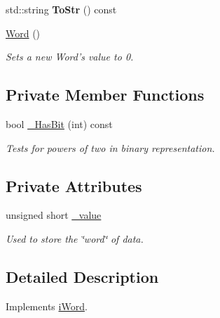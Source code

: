 \begin{DoxyCompactItemize}
\item 
\hypertarget{classWord_a5f8c5dcdb847ed96021ef9282ccc7e76}{
std::string {\bfseries ToStr} () const }
\label{classWord_a5f8c5dcdb847ed96021ef9282ccc7e76}

\item 
\hypertarget{classWord_a17baf7109d46beb48d5b469f3baedc48}{
\hyperlink{classWord_a17baf7109d46beb48d5b469f3baedc48}{Word} ()}
\label{classWord_a17baf7109d46beb48d5b469f3baedc48}

\begin{DoxyCompactList}\small\item\em Sets a new Word's value to 0. \item\end{DoxyCompactList}\end{DoxyCompactItemize}
\subsection*{Private Member Functions}
\begin{DoxyCompactItemize}
\item 
bool \hyperlink{classWord_a7190b6fab0a952eac77da5c0f4ddd0cf}{\_\-HasBit} (int) const 
\begin{DoxyCompactList}\small\item\em Tests for powers of two in binary representation. \item\end{DoxyCompactList}\end{DoxyCompactItemize}
\subsection*{Private Attributes}
\begin{DoxyCompactItemize}
\item 
unsigned short \hyperlink{classWord_a8b0aa1f2042266f307c51b3bdafa9128}{\_\-value}
\begin{DoxyCompactList}\small\item\em Used to store the \char`\"{}word\char`\"{} of data. \item\end{DoxyCompactList}\end{DoxyCompactItemize}


\subsection{Detailed Description}
Implements \hyperlink{classiWord}{iWord}. 

